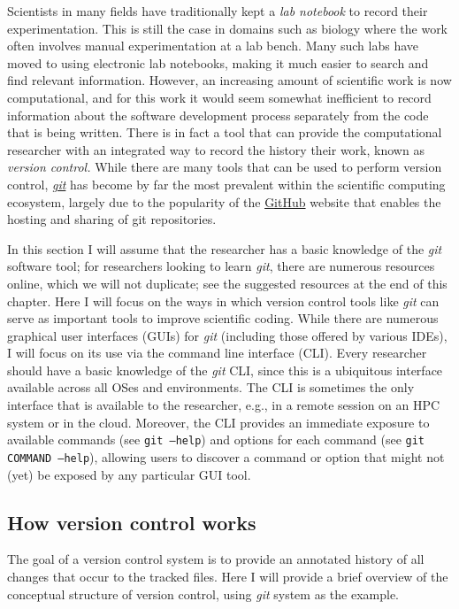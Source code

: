 Scientists in many fields have traditionally kept a \textit{lab notebook} to record their experimentation.
This is still the case in domains such as biology where the work often involves manual experimentation at a lab bench.
Many such labs have moved to using electronic lab notebooks, making it much easier to search and find relevant information.
However, an increasing amount of scientific work is now computational, and for this work it would seem somewhat inefficient to record information about the software development process separately from the code that is being written.
There is in fact a tool that can provide the computational researcher with an integrated way to record the history their work, known as \textit{version control.} While there are many tools that can be used to perform version control, \textit{\href{https://git-scm.com/}{git}} has become by far the most prevalent within the scientific computing ecosystem, largely due to the popularity of the \href{http://github.com}{GitHub} website that enables the hosting and sharing of git repositories.

In this section I will assume that the researcher has a basic knowledge of the \textit{git} software tool; for researchers looking to learn \textit{git}, there are numerous resources online, which we will not duplicate; see the suggested resources at the end of this chapter.
Here I will focus on the ways in which version control tools like \textit{git} can serve as important tools to improve scientific coding.
While there are numerous graphical user interfaces (GUIs) for \textit{git} (including those offered by various IDEs), I will focus on its use via the command line interface (CLI).
Every researcher should have a basic knowledge of the \textit{git} CLI, since this is a ubiquitous interface available across all OSes and environments.
The CLI is sometimes the only interface that is available to the researcher, e.g., in a remote session on an HPC system or in the cloud.
Moreover, the CLI provides an immediate exposure to available commands (see \texttt{git --help}) and options for each command (see \texttt{git COMMAND --help}), allowing users to discover a command or option that might not (yet) be exposed by any particular GUI tool.

\subsection{How version control works}

The goal of a version control system is to provide an annotated history of all changes that occur to the tracked files.
Here I will provide a brief overview of the conceptual structure of version control, using \textit{git} system as the example.


